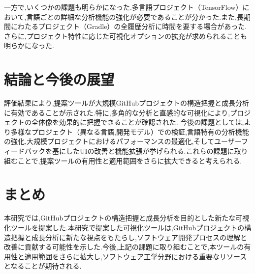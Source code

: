 \documentclass[12pt,twoside]{jbook}
\begin{document}
一方で,いくつかの課題も明らかになった.多言語プロジェクト（TensorFlow）において,言語ごとの詳細な分析機能の強化が必要であることが分かった.また,長期間にわたるプロジェクト（Gradle）の全履歴分析に時間を要する場合があった.さらに,プロジェクト特性に応じた可視化オプションの拡充が求められることも明らかになった.
\chapter{結論と今後の展望}
評価結果により,提案ツールが大規模GitHubプロジェクトの構造把握と成長分析に有効であることが示された.特に,多角的な分析と直感的な可視化により,プロジェクトの全体像を効果的に把握できることが確認された.
今後の課題としては,より多様なプロジェクト（異なる言語,開発モデル）での検証,言語特有の分析機能の強化,大規模プロジェクトにおけるパフォーマンスの最適化,そしてユーザーフィードバックを基にしたUIの改善と機能拡張が挙げられる.これらの課題に取り組むことで,提案ツールの有用性と適用範囲をさらに拡大できると考えられる.

\chapter{まとめ}
本研究では,GitHubプロジェクトの構造把握と成長分析を目的とした新たな可視化ツールを提案した.本研究で提案した可視化ツールは,GitHubプロジェクトの構造把握と成長分析に新たな視点をもたらし,ソフトウェア開発プロセスの理解と改善に貢献する可能性を示した.今後,上記の課題に取り組むことで,本ツールの有用性と適用範囲をさらに拡大し,ソフトウェア工学分野における重要なリソースとなることが期待される.



%
%




\appendix
\end{document}
